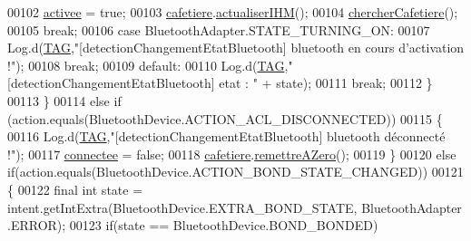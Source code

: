 \begin{DoxyCode}
00102                             \hyperlink{classcom_1_1example_1_1ekawa_1_1_communication_a2f49177a9865ed41a759bce83658bb6e}{activee} = \textcolor{keyword}{true};
00103                             \hyperlink{classcom_1_1example_1_1ekawa_1_1_communication_a3b69b78cdf60bc35b2e3e564519dc1b6}{cafetiere}.\hyperlink{classcom_1_1example_1_1ekawa_1_1_cafetiere_ad8c8b7d410315f55a216de809571fd87}{actualiserIHM}();
00104                             \hyperlink{classcom_1_1example_1_1ekawa_1_1_communication_afc96e58f53fc167fe9fc76a229c01cb0}{chercherCafetiere}();
00105                             \textcolor{keywordflow}{break};
00106                         \textcolor{keywordflow}{case} BluetoothAdapter.STATE\_TURNING\_ON:
00107                             Log.d(\hyperlink{classcom_1_1example_1_1ekawa_1_1_communication_af355bac38153a4e6d1cda0b3e74bc1c7}{TAG},\textcolor{stringliteral}{"[detectionChangementEtatBluetooth] bluetooth en cours
       d'activation !"});
00108                             \textcolor{keywordflow}{break};
00109                         \textcolor{keywordflow}{default}:
00110                             Log.d(\hyperlink{classcom_1_1example_1_1ekawa_1_1_communication_af355bac38153a4e6d1cda0b3e74bc1c7}{TAG},\textcolor{stringliteral}{"[detectionChangementEtatBluetooth] etat : "} + state);
00111                             \textcolor{keywordflow}{break};
00112                     \}
00113                 \}
00114                 \textcolor{keywordflow}{else} \textcolor{keywordflow}{if} (action.equals(BluetoothDevice.ACTION\_ACL\_DISCONNECTED))
00115                 \{
00116                     Log.d(\hyperlink{classcom_1_1example_1_1ekawa_1_1_communication_af355bac38153a4e6d1cda0b3e74bc1c7}{TAG},\textcolor{stringliteral}{"[detectionChangementEtatBluetooth] bluetooth déconnecté !"});
00117                     \hyperlink{classcom_1_1example_1_1ekawa_1_1_communication_a93d9caaa9d4454a32d9dc28a6f22d2eb}{connectee} = \textcolor{keyword}{false};
00118                     \hyperlink{classcom_1_1example_1_1ekawa_1_1_communication_a3b69b78cdf60bc35b2e3e564519dc1b6}{cafetiere}.\hyperlink{classcom_1_1example_1_1ekawa_1_1_cafetiere_a10a040b45cfaac52cd5c26049bf2d7b7}{remettreAZero}();
00119                 \}
00120                 \textcolor{keywordflow}{else} \textcolor{keywordflow}{if}(action.equals(BluetoothDevice.ACTION\_BOND\_STATE\_CHANGED))
00121                 \{
00122                     \textcolor{keyword}{final} \textcolor{keywordtype}{int} state = intent.getIntExtra(BluetoothDevice.EXTRA\_BOND\_STATE, BluetoothAdapter
      .ERROR);
00123                     \textcolor{keywordflow}{if}(state == BluetoothDevice.BOND\_BONDED)

\end{DoxyCode}
